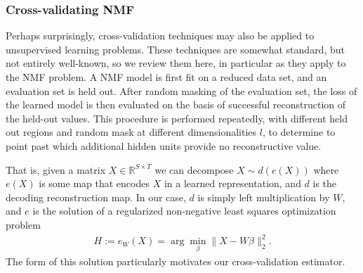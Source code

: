 \subsubsection{Cross-validating NMF}

Perhaps surprisingly, cross-validation techniques may also be applied to unsupervised learning problems.
These techniques are somewhat standard, but not entirely well-known, so we review them here, in particular as they apply to the NMF problem.
A NMF model is first fit on a reduced data set, and an evaluation set is held out.
After random masking of the evaluation set, the loss of the learned model is then evaluated on the basis of successful reconstruction of the held-out values.
This procedure is performed repeatedly, with different held out regions and random mask at different dimensionalities $l$, to determine to point past which additional hidden units provide no reconstructive value.

That is, given a matrix $X \in \mathbb R^{S \times T}$ we can decompose $X \sim d(e(X))$ where $e(X)$ is some map that encodes $X$ in a learned representation, and $d$ is the decoding reconstruction map.
In our case, $d$ is simply left multiplication by $W$, and $e$ is the solution of a regularized non-negative least squares optimization problem
\begin{align*}
H := e_W(X) = \arg \min_{\beta} \|X - W \beta\|_2^2.
\end{align*}
The form of this solution particularly motivates our cross-validation estimator.


